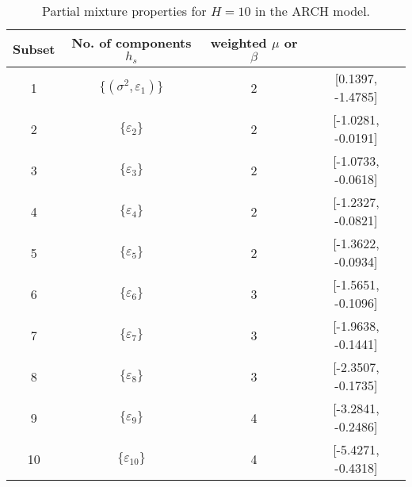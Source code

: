 \begin{table}[h] 
\centering 
\caption{Partial mixture properties for $H=10$ in the ARCH model.} 
\label{tab:pmits_arch} 
\begin{tabular}{cccc}  
 Subset & No. of components $h_{s}$ & weighted $\mu$ or $\beta$  \\ \hline 
1 & $\{(\sigma^{2},\varepsilon_{1})\}$ & 2 & [0.1397, -1.4785]   \\ [1ex] 
2 & $\{\varepsilon_{2}\}$ & 2 & [-1.0281, -0.0191]   \\ [1ex] 
3 & $\{\varepsilon_{3}\}$ & 2 & [-1.0733, -0.0618]   \\ [1ex] 
4 & $\{\varepsilon_{4}\}$ & 2 & [-1.2327, -0.0821]   \\ [1ex] 
5 & $\{\varepsilon_{5}\}$ & 2 & [-1.3622, -0.0934]   \\ [1ex] 
6 & $\{\varepsilon_{6}\}$ & 3 & [-1.5651, -0.1096]   \\ [1ex] 
7 & $\{\varepsilon_{7}\}$ & 3 & [-1.9638, -0.1441]   \\ [1ex] 
8 & $\{\varepsilon_{8}\}$ & 3 & [-2.3507, -0.1735]   \\ [1ex] 
9 & $\{\varepsilon_{9}\}$ & 4 & [-3.2841, -0.2486]   \\ [1ex] 
10 & $\{\varepsilon_{10}\}$ & 4 & [-5.4271, -0.4318]   \\ [1ex] 
\hline 
\end{tabular} 
\end{table} 
